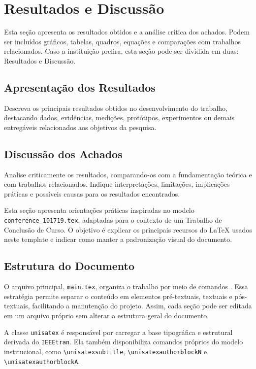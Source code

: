 \section{Resultados e Discussão}
Esta seção apresenta os resultados obtidos e a análise crítica dos achados. Podem ser incluídos gráficos, tabelas, quadros, equações e comparações com trabalhos relacionados. Caso a instituição prefira, esta seção pode ser dividida em duas: Resultados e Discussão.

\subsection{Apresentação dos Resultados}
Descreva os principais resultados obtidos no desenvolvimento do trabalho, destacando dados, evidências, medições, protótipos, experimentos ou demais entregáveis relacionados aos objetivos da pesquisa.

\subsection{Discussão dos Achados}
Analise criticamente os resultados, comparando-os com a fundamentação teórica e com trabalhos relacionados. Indique interpretações, limitações, implicações práticas e possíveis causas para os resultados encontrados.

Esta seção apresenta orientações práticas inspiradas no modelo \texttt{conference\_101719.tex}, adaptadas para o contexto de um Trabalho de Conclusão de Curso. O objetivo é explicar os principais recursos do \LaTeX{} usados neste template e indicar como manter a padronização visual do documento.

\subsection{Estrutura do Documento}
O arquivo principal, \texttt{main.tex}, organiza o trabalho por meio de comandos \verb||. Essa estratégia permite separar o conteúdo em elementos pré-textuais, textuais e pós-textuais, facilitando a manutenção do projeto. Assim, cada seção pode ser editada em um arquivo próprio sem alterar a estrutura geral do documento.

A classe \texttt{unisatex} é responsável por carregar a base tipográfica e estrutural derivada do \texttt{IEEEtran}. Ela também disponibiliza comandos próprios do modelo institucional, como \verb|\unisatexsubtitle|, \verb|\unisatexauthorblockN| e \verb|\unisatexauthorblockA|.

